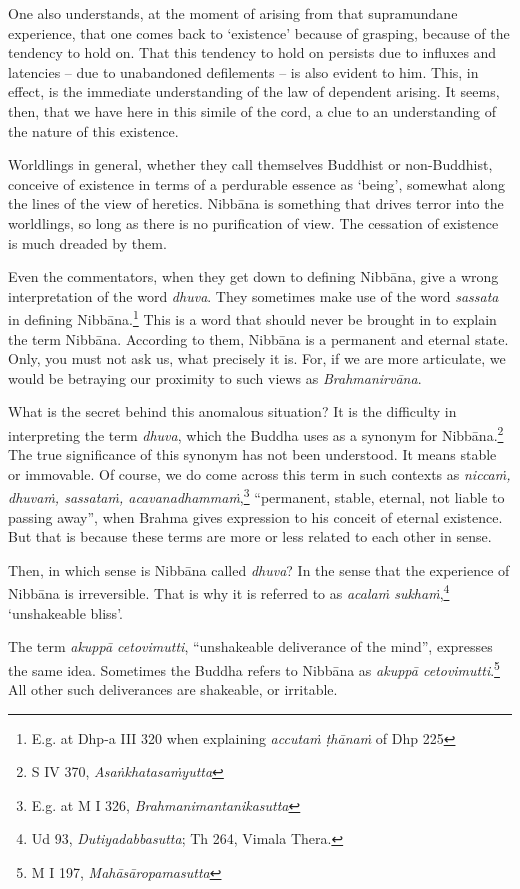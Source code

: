 One also understands, at the moment of arising from that supramundane experience, that one comes back to `existence' because of grasping, because of the tendency to hold on. That this tendency to hold on persists due to influxes and latencies -- due to unabandoned defilements -- is also evident to him. This, in effect, is the immediate understanding of the law of dependent arising. It seems, then, that we have here in this simile of the cord, a clue to an understanding of the nature of this existence.

Worldlings in general, whether they call themselves Buddhist or non-Buddhist, conceive of existence in terms of a perdurable essence as `being', somewhat along the lines of the view of heretics. Nibbāna is something that drives terror into the worldlings, so long as there is no purification of view. The cessation of existence is much dreaded by them.

Even the commentators, when they get down to defining Nibbāna, give a wrong interpretation of the word \emph{dhuva}. They sometimes make use of the word \emph{sassata} in defining Nibbāna.\footnote{E.g. at Dhp-a III 320 when explaining \emph{accutaṁ ṭhānaṁ} of Dhp 225} This is a word that should never be brought in to explain the term Nibbāna. According to them, Nibbāna is a permanent and eternal state. Only, you must not ask us, what precisely it is. For, if we are more articulate, we would be betraying our proximity to such views as \emph{Brahmanirvāna}.

What is the secret behind this anomalous situation? It is the difficulty in interpreting the term \emph{dhuva}, which the Buddha uses as a synonym for Nibbāna.\footnote{S IV 370, \emph{Asaṅkhatasaṁyutta}} The true significance of this synonym has not been understood. It means stable or immovable. Of course, we do come across this term in such contexts as \emph{niccaṁ, dhuvaṁ, sassataṁ, acavanadhammaṁ},\footnote{E.g. at M I 326, \emph{Brahmanimantanikasutta}} ``permanent, stable, eternal, not liable to passing away'', when Brahma gives expression to his conceit of eternal existence. But that is because these terms are more or less related to each other in sense.

Then, in which sense is Nibbāna called \emph{dhuva}? In the sense that the experience of Nibbāna is irreversible. That is why it is referred to as \emph{acalaṁ sukhaṁ},\footnote{Ud 93, \emph{Dutiyadabbasutta}; Th 264, Vimala Thera.} `unshakeable bliss'.

The term \emph{akuppā cetovimutti}, ``unshakeable deliverance of the mind'', expresses the same idea. Sometimes the Buddha refers to Nibbāna as \emph{akuppā cetovimutti}.\footnote{M I 197, \emph{Mahāsāropamasutta}} All other such deliverances are shakeable, or irritable.

